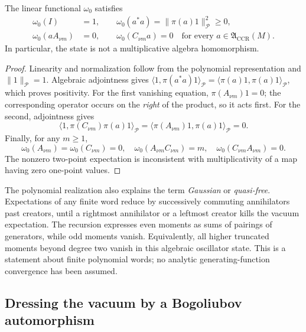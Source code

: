 \begin{proposition}
\label{prop:ch19-polynomial-state}
The linear functional $\omega_0$ satisfies
\begin{align}
 \omega_0(I)&=1,\qquad
 \omega_0(a^*a)=\|\pi(a)1\|_{\mathcal P}^2\geq0,
 \label{eq:ch19-omega0-positive}\\
 \omega_0(aA_{\nu m})&=0,\qquad
 \omega_0(C_{\nu m}a)=0
 \quad\text{for every }a\in\mathfrak A_{\mathrm{CCR}}(M).
 \label{eq:ch19-omega0-annihilation}
\end{align}
In particular, the state is not a multiplicative algebra homomorphism.
\end{proposition}
\begin{proof}
Linearity and normalization follow from the polynomial representation
and $\|1\|_{\mathcal P}=1$.  Algebraic adjointness gives
$\langle1,\pi(a^*a)1\rangle_{\mathcal P}
 =\langle\pi(a)1,\pi(a)1\rangle_{\mathcal P}$,
which proves positivity.  For the first vanishing equation,
$\pi(A_{\nu m})1=0$; the corresponding operator occurs on the
\emph{right} of the product, so it acts first.  For the second,
adjointness gives
\[
 \langle1,\pi(C_{\nu m})\pi(a)1\rangle_{\mathcal P}
 =\langle\pi(A_{\nu m})1,\pi(a)1\rangle_{\mathcal P}=0.
\]
Finally, for any $m\geq1$,
\[
 \omega_0(A_{\nu m})=\omega_0(C_{\nu m})=0,
 \quad\omega_0(A_{\nu m}C_{\nu m})=m,
 \quad\omega_0(C_{\nu m}A_{\nu m})=0.
\]
The nonzero two-point expectation is inconsistent with
multiplicativity of a map having zero one-point values.
\end{proof}

The polynomial realization also explains the term \emph{Gaussian} or
\emph{quasi-free}.  Expectations of any finite word reduce by successively
commuting annihilators past creators, until a rightmost annihilator or a
leftmost creator kills the vacuum expectation.  The recursion expresses
even moments as sums of pairings of generators, while odd moments vanish.
Equivalently, all higher truncated moments beyond degree two vanish in this
algebraic oscillator state.  This is a statement about finite polynomial
words; no analytic generating-function convergence has been assumed.

\subsection{Dressing the vacuum by a Bogoliubov automorphism}

